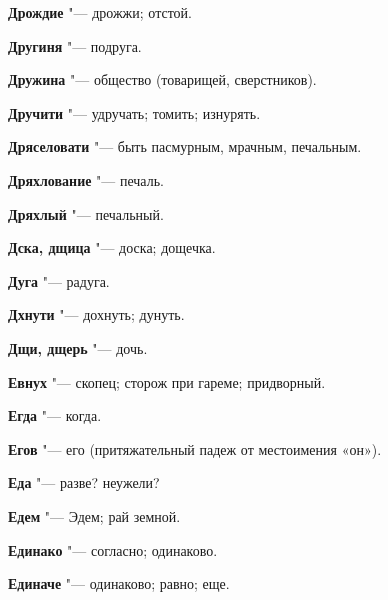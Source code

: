 \begin{mymulticols}{2}
\noindent\textbf{Дрождие} "--- дрожжи; отстой. 




\noindent\textbf{Другиня} "--- подруга. 




\noindent\textbf{Дружина} "--- общество (товарищей, сверстников). 




\noindent\textbf{Дручити} "--- удручать; томить; изнурять. 




\noindent\textbf{Дряселовати} "--- быть пасмурным, мрачным, печальным. 




\noindent\textbf{Дряхлование} "--- печаль. 




\noindent\textbf{Дряхлый} "--- печальный. 




\noindent\textbf{Дска, дщица} "--- доска; дощечка. 




\noindent\textbf{Дуга} "--- радуга. 




\noindent\textbf{Дхнути} "--- дохнуть; дунуть. 




\noindent\textbf{Дщи, дщерь} "--- дочь. 




\bukvaending






\noindent\textbf{Евнух} "--- скопец; сторож при гареме; придворный. 




\noindent\textbf{Егда} "--- когда. 




\noindent\textbf{Егов} "--- его (притяжательный падеж от местоимения «он»). 




\noindent\textbf{Еда} "--- разве? неужели? 




\noindent\textbf{Едем} "--- Эдем; рай земной. 




\noindent\textbf{Единако} "--- согласно; одинаково. 




\noindent\textbf{Единаче} "--- одинаково; равно; еще. 





\end{mymulticols}
